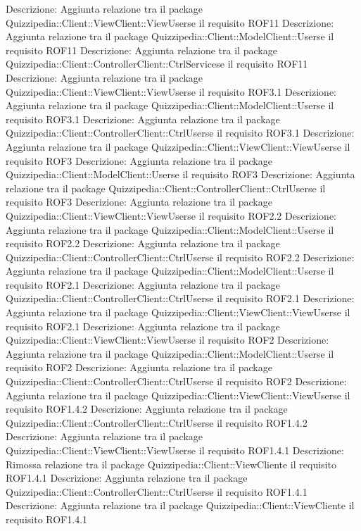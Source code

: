 Descrizione: Aggiunta relazione tra il package Quizzipedia::Client::ViewClient::ViewUserse il requisito ROF11 
Descrizione: Aggiunta relazione tra il package Quizzipedia::Client::ModelClient::Userse il requisito ROF11 
Descrizione: Aggiunta relazione tra il package Quizzipedia::Client::ControllerClient::CtrlServicese il requisito ROF11 
Descrizione: Aggiunta relazione tra il package Quizzipedia::Client::ViewClient::ViewUserse il requisito ROF3.1 
Descrizione: Aggiunta relazione tra il package Quizzipedia::Client::ModelClient::Userse il requisito ROF3.1 
Descrizione: Aggiunta relazione tra il package Quizzipedia::Client::ControllerClient::CtrlUserse il requisito ROF3.1 
Descrizione: Aggiunta relazione tra il package Quizzipedia::Client::ViewClient::ViewUserse il requisito ROF3 
Descrizione: Aggiunta relazione tra il package Quizzipedia::Client::ModelClient::Userse il requisito ROF3 
Descrizione: Aggiunta relazione tra il package Quizzipedia::Client::ControllerClient::CtrlUserse il requisito ROF3 
Descrizione: Aggiunta relazione tra il package Quizzipedia::Client::ViewClient::ViewUserse il requisito ROF2.2 
Descrizione: Aggiunta relazione tra il package Quizzipedia::Client::ModelClient::Userse il requisito ROF2.2 
Descrizione: Aggiunta relazione tra il package Quizzipedia::Client::ControllerClient::CtrlUserse il requisito ROF2.2 
Descrizione: Aggiunta relazione tra il package Quizzipedia::Client::ModelClient::Userse il requisito ROF2.1 
Descrizione: Aggiunta relazione tra il package Quizzipedia::Client::ControllerClient::CtrlUserse il requisito ROF2.1 
Descrizione: Aggiunta relazione tra il package Quizzipedia::Client::ViewClient::ViewUserse il requisito ROF2.1 
Descrizione: Aggiunta relazione tra il package Quizzipedia::Client::ViewClient::ViewUserse il requisito ROF2 
Descrizione: Aggiunta relazione tra il package Quizzipedia::Client::ModelClient::Userse il requisito ROF2 
Descrizione: Aggiunta relazione tra il package Quizzipedia::Client::ControllerClient::CtrlUserse il requisito ROF2 
Descrizione: Aggiunta relazione tra il package Quizzipedia::Client::ViewClient::ViewUserse il requisito ROF1.4.2 
Descrizione: Aggiunta relazione tra il package Quizzipedia::Client::ControllerClient::CtrlUserse il requisito ROF1.4.2 
Descrizione: Aggiunta relazione tra il package Quizzipedia::Client::ViewClient::ViewUserse il requisito ROF1.4.1 
Descrizione: Rimossa relazione tra il package Quizzipedia::Client::ViewCliente il requisito ROF1.4.1 
Descrizione: Aggiunta relazione tra il package Quizzipedia::Client::ControllerClient::CtrlUserse il requisito ROF1.4.1 
Descrizione: Aggiunta relazione tra il package Quizzipedia::Client::ViewCliente il requisito ROF1.4.1 

